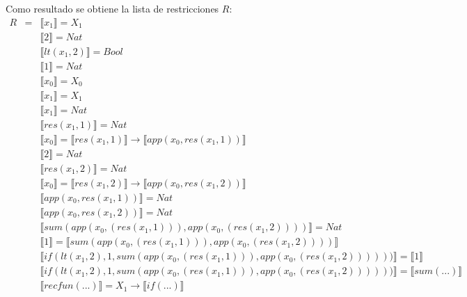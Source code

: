 \begin{exercise}
\begin{description}
           \item Como resultado se obtiene la lista de restricciones $R$:
            \[
                \begin{array}{rclr}
                R&=&  \llbracket x_1 \rrbracket = X_1  \\
                &&  \llbracket 2 \rrbracket = Nat\\
                &&  \llbracket lt(x_1 , 2) \rrbracket = Bool\\
                &&  \llbracket 1 \rrbracket = Nat\\
                &&  \llbracket x_0 \rrbracket = X_0 \\
                &&  \llbracket x_1 \rrbracket = X_1 \\
                &&  \llbracket x_1 \rrbracket = Nat\\
                &&  \llbracket res(x_1,1) \rrbracket = Nat \\
                &&  \llbracket x_0 \rrbracket =  \llbracket res(x_1,1) \rrbracket \to  \llbracket app(x_0, res(x_1,1)) \rrbracket\\
                &&  \llbracket 2 \rrbracket = Nat \\
                &&  \llbracket res(x_1,2) \rrbracket = Nat \\
                &&  \llbracket x_0 \rrbracket =  \llbracket res(x_1,2) \rrbracket \to  \llbracket app(x_0, res(x_1,2)) \rrbracket \\
                &&  \llbracket app(x_0, res(x_1,1)) \rrbracket = Nat \\
                &&  \llbracket app(x_0, res(x_1,2)) \rrbracket = Nat \\	
	      &&   \llbracket sum(app(x_0, (res(x_1,1))), app(x_0, (res(x_1,2))))  \rrbracket = Nat \\
                &&  \llbracket 1 \rrbracket =  \llbracket sum(app(x_0, (res(x_1,1))), app(x_0, (res(x_1,2)))) \rrbracket \\
                &&  \llbracket if(lt(x_1 , 2), 1, sum(app(x_0, (res(x_1,1))), app(x_0, (res(x_1,2)))))) \rrbracket =  \llbracket 1 \rrbracket\\
                &&  \llbracket if(lt(x_1 , 2), 1, sum(app(x_0, (res(x_1,1))), app(x_0, (res(x_1,2)))))) \rrbracket =  \llbracket sum(...)  \rrbracket \\
                &&  \llbracket recfun(...) \rrbracket =   X_1  \to  \llbracket if(...) \rrbracket \\
                \end{array}
            \]


\end{description}
\end{exercise}
